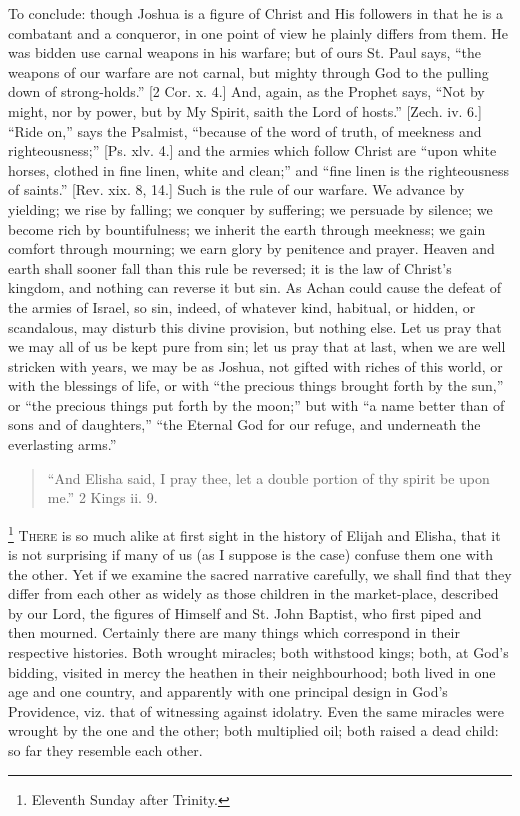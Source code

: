 To conclude: though Joshua is a figure of Christ and His followers
in that he is a combatant and a conqueror, in one point of view he
plainly differs from them. He was bidden use carnal weapons in his
warfare; but of ours St. Paul says, ``the weapons of our warfare
are not carnal, but mighty through God to the pulling down of
strong-holds.'' [2 Cor. x. 4.] And, again, as the Prophet says,
``Not by might, nor by power, but by My Spirit, saith the Lord of
hosts.'' [Zech. iv. 6.] ``Ride on,'' says the Psalmist,
``because of the word of truth, of meekness and
righteousness;'' [Ps. xlv. 4.] and the armies which follow Christ
are ``upon white horses, clothed in fine linen, white and
clean;'' and ``fine linen is the righteousness of
saints.'' [Rev. xix. 8, 14.] Such is the rule of our warfare. We
advance by yielding; we rise by falling; we conquer by suffering; we
persuade by silence; we become rich by bountifulness; we inherit the
earth through meekness; we gain comfort through mourning; we earn
glory by penitence and prayer. Heaven and earth shall sooner fall than
this rule be reversed; it is the law of Christ's kingdom, and nothing
can reverse it but sin. As Achan could cause the defeat of the armies
of Israel, so sin, indeed, of whatever kind, habitual, or hidden, or
scandalous, may disturb this divine provision, but nothing else. Let
us pray that we may all of us be kept pure from sin; let us pray that
at last, when we are well stricken with years, we may be as Joshua,
not gifted with riches of this world, or with the blessings of life,
or with ``the precious things brought forth by the sun,'' or
``the precious things put forth by the moon;'' but with
``a name better than of sons and of daughters,'' ``the
Eternal God for our refuge, and underneath the everlasting arms.''


\begin{quote}

``And Elisha said, I pray thee, let a double portion of thy
spirit be upon me.'' 2 Kings ii. 9.

\end{quote}

\footnote{Eleventh Sunday after Trinity.} T\textsc{here} is so much alike at first sight in the history of Elijah and
Elisha, that it is not surprising if many of us (as I suppose is the
case) confuse them one with the other. Yet if we examine the sacred
narrative carefully, we shall find that they differ from each other as
widely as those children in the market-place, described by our Lord,
the figures of Himself and St. John Baptist, who first piped and then
mourned. Certainly there are many things which correspond in their
respective histories. Both wrought miracles; both withstood kings;
both, at God's bidding, visited in mercy the heathen in their
neighbourhood; both lived in one age and one country, and apparently
with one principal design in God's Providence, viz. that of witnessing
against idolatry. Even the same miracles were wrought by the one and
the other; both multiplied oil; both raised a dead child: so far they
resemble each other.


